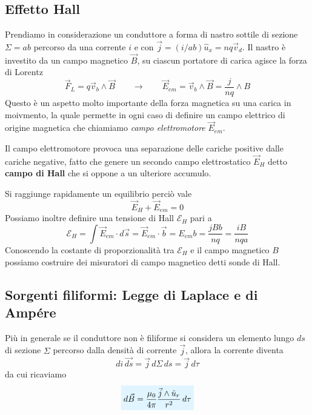 \documentclass[x11names]{report}
\begin{document}
\subsection{Effetto Hall}
Prendiamo in considerazione un conduttore a forma di nastro sottile di sezione \(\Sigma = ab\) percorso da una corrente \(i\) e con \(\vec{j} = (i/ab) \hat{u}_x = nq\vec{v}_d\). Il nastro è investito da un campo magnetico \(\vec{B}\), su ciascun portatore di carica agisce la forza di Lorentz
\[
\vec{F}_L = q\vec{v}_b \wedge \vec{B} \qquad \to \qquad \vec{E}_{em} = \vec{v}_b \wedge \vec{B} = \frac{j}{nq} \wedge B
\]
Questo è un aspetto molto importante della forza magnetica su una carica in moivmento, la quale permette in ogni caso di definire un campo elettrico di origine magnetica che chiamiamo \textit{campo elettromotore} \(\vec{E}_{em}\).
\begin{figure}[H]
	\centering
\end{figure}
Il campo elettromotore provoca una separazione delle cariche positive dalle cariche negative, fatto che genere un secondo campo elettrostatico \(\vec{E}_H\) detto \textbf{campo di Hall} che si oppone a un ulteriore accumulo.
\begin{figure}[H]
	\centering
\end{figure}
Si raggiunge rapidamente un equilibrio perciò vale
\[
\vec{E}_H + \vec{E}_{em} = 0
\]
Possiamo inoltre definire una tensione di Hall \(\mathcal{E}_H\) pari a 
\[
\mathcal{E}_H = \int \vec{E}_{em} \cdot d\vec{s} = \vec{E}_{em} \cdot \vec{b} = E_{em}b = \frac{jBb}{nq} = \frac{iB}{nqa}
\]
Conoscendo la costante di proporzionalità tra \(\mathcal{E}_H\) e il campo magnetico \(B\) possiamo costruire dei misuratori di campo magnetico detti sonde di Hall.

\subsection{Sorgenti filiformi: Legge di Laplace e di Ampére}
Più in generale se il conduttore non è filiforme si considera un elemento lungo \(ds\) di sezione \(\Sigma\) percorso dalla densità di corrente \(\vec{j}\), allora la corrente diventa
\[
di \,\vec{ds} = \vec{j} \, d\Sigma \, ds = \vec{j} \, d\tau
\]
da cui ricaviamo
\begin{equation}
	\viola{d\vec{B} = \frac{\mu_0}{4\pi} \frac{\vec{j}\wedge \hat{u}_r}{r^2} \, d\tau}
\end{equation}
\end{document}
